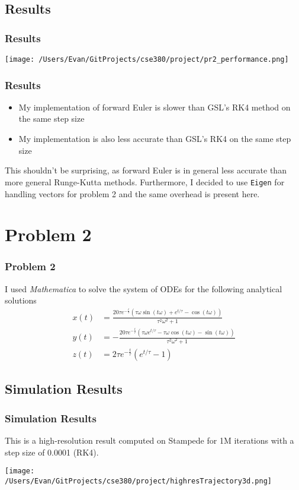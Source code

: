 \documentclass{beamer}
\begin{document}
\subsection{Results}
\begin{frame}
\frametitle{Results}
\begin{center}
\texttt{[image: /Users/Evan/GitProjects/cse380/project/pr2\_performance.png]}
\end{center}
\end{frame}

\begin{frame}
\frametitle{Results}
\begin{itemize}
\item My implementation of forward Euler is slower than GSL's RK4 method on the same step size
\item My implementation is also less accurate than GSL's RK4 on the same step size
\end{itemize}
This shouldn't be surprising, as forward Euler is in general less accurate than more general Runge-Kutta methods.
Furthermore, I decided to use \texttt{Eigen} for handling vectors for problem 2 and the same overhead is present here.
\end{frame}

\section{Problem 2}
\begin{frame}
\frametitle{Problem 2}
I used \emph{Mathematica} to solve the system of ODEs for the following analytical solutions
\begin{align*}
x(t)&=\frac{20 \tau  e^{-\frac{t}{\tau }} \left(\tau  \omega  \sin (t \omega )+e^{t/\tau }-\cos (t \omega )\right)}{\tau ^2 \omega ^2+1}\\
y(t)&=-\frac{20 \tau  e^{-\frac{t}{\tau }} \left(\tau  \omega  e^{t/\tau }-\tau  \omega  \cos (t \omega )-\sin (t \omega )\right)}{\tau ^2 \omega ^2+1}\\
z(t)&=2 \tau  e^{-\frac{t}{\tau }} \left(e^{t/\tau }-1\right)
\end{align*}
\end{frame}

\subsection{Simulation Results}
\begin{frame}
\frametitle{Simulation Results}
This is a high-resolution result computed on Stampede for 1M iterations with a step size of 0.0001 (RK4).

\texttt{[image: /Users/Evan/GitProjects/cse380/project/highresTrajectory3d.png]}
\end{frame}
\end{document}
